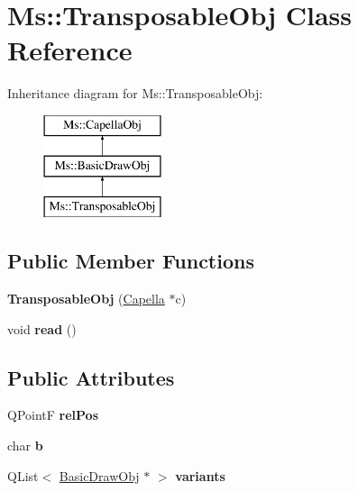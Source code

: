 \hypertarget{class_ms_1_1_transposable_obj}{}\section{Ms\+:\+:Transposable\+Obj Class Reference}
\label{class_ms_1_1_transposable_obj}
Inheritance diagram for Ms\+:\+:Transposable\+Obj\+:\begin{figure}[H]
\begin{center}
\leavevmode
\includegraphics[height=3.000000cm]{class_ms_1_1_transposable_obj}
\end{center}
\end{figure}
\subsection*{Public Member Functions}
\begin{DoxyCompactItemize}
\item 
\mbox{\label{class_ms_1_1_transposable_obj_a8a2b14b33c62acf7792fcd3987a9489a}} 
{\bfseries Transposable\+Obj} (\hyperlink{class_ms_1_1_capella}{Capella} $\ast$c)
\item 
\mbox{\label{class_ms_1_1_transposable_obj_a6342d09322cb130198f8326c34f7fa3b}} 
void {\bfseries read} ()
\end{DoxyCompactItemize}
\subsection*{Public Attributes}
\begin{DoxyCompactItemize}
\item 
\mbox{\label{class_ms_1_1_transposable_obj_aea0b8581cf2ecca16a1dce549881c015}} 
Q\+PointF {\bfseries rel\+Pos}
\item 
\mbox{\label{class_ms_1_1_transposable_obj_aab243e7920676545d220d98508686525}} 
char {\bfseries b}
\item 
\mbox{\label{class_ms_1_1_transposable_obj_ada364a6ccf0aba4880b872597ffaf95e}} 
Q\+List$<$ \hyperlink{class_ms_1_1_basic_draw_obj}{Basic\+Draw\+Obj} $\ast$ $>$ {\bfseries variants}
\end{DoxyCompactItemize}
